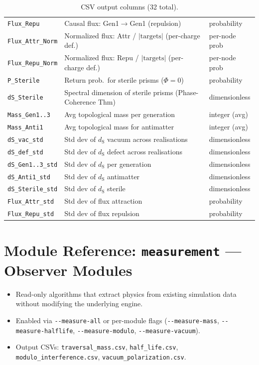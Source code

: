 \documentclass[11pt, a4paper, openany]{book}
\newcommand{\dS}{d_{\mathrm{S}}}
\newcommand{\code}[1]{\texttt{#1}}
\newcommand{\modname}[1]{\texttt{\bfseries\color{main}#1}}
\newcounter{thm}[chapter]
\newenvironment{introduction}[1][Chapter Overview]{%
  \begin{tcolorbox}[
    enhanced,colback=structure!5,colframe=structure,
    colbacktitle=structure,coltitle=white,
    fonttitle=\small\bfseries,title={#1},
    arc=2pt,boxrule=0.7pt,
    left=8pt,right=8pt,top=6pt,bottom=6pt,
    before skip=12pt,after skip=12pt
  ]\itshape\begin{itemize}[leftmargin=*,itemsep=2pt,parsep=0pt]
}{%
  \end{itemize}\end{tcolorbox}
}
\begin{document}
\begin{table}[H]
\begin{tabular}{@{} l l l @{}}
\code{Flux\_Repu} & Causal flux: Gen1$\to$Gen1 (repulsion)      & probability \\
\code{Flux\_Attr\_Norm} & Normalized flux: Attr / $|\text{targets}|$ (per-charge def.) & per-node prob \\
\code{Flux\_Repu\_Norm} & Normalized flux: Repu / $|\text{targets}|$ (per-charge def.) & per-node prob \\
\code{P\_Sterile}  & Return prob.\ for sterile prisms ($\Phi = 0$) & probability \\
\code{dS\_Sterile} & Spectral dimension of sterile prisms (Phase-Coherence Thm) & dimensionless \\
\code{Mass\_Gen1..3} & Avg topological mass per generation         & integer (avg) \\
\code{Mass\_Anti1}   & Avg topological mass for antimatter        & integer (avg) \\
\code{dS\_vac\_std}  & Std dev of $\dS$ vacuum across realisations & dimensionless \\
\code{dS\_def\_std}  & Std dev of $\dS$ defect across realisations & dimensionless \\
\code{dS\_Gen1..3\_std} & Std dev of $\dS$ per generation          & dimensionless \\
\code{dS\_Anti1\_std}   & Std dev of $\dS$ antimatter              & dimensionless \\
\code{dS\_Sterile\_std} & Std dev of $\dS$ sterile                 & dimensionless \\
\code{Flux\_Attr\_std}  & Std dev of flux attraction                & probability \\
\code{Flux\_Repu\_std}  & Std dev of flux repulsion                & probability \\
\bottomrule
\end{tabular}
\caption{CSV output columns (32 total).}
\label{tab:csv}
\end{table}


\chapter{Module Reference: \modname{measurement} --- Observer Modules}

\begin{introduction}[Phase~3.5: Four Observer Measurements]
  \item Read-only algorithms that extract physics from existing simulation data
        without modifying the underlying engine.
  \item Enabled via \code{-{}-measure-all} or per-module flags
        (\code{-{}-measure-mass}, \code{-{}-measure-halflife},
        \code{-{}-measure-modulo}, \code{-{}-measure-vacuum}).
  \item Output CSVs: \code{traversal\_mass.csv}, \code{half\_life.csv},
        \code{modulo\_interference.csv}, \code{vacuum\_polarization.csv}.
\end{introduction}
\end{document}
